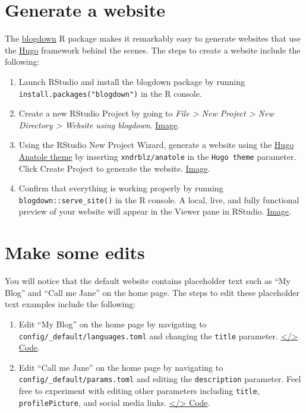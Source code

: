\documentclass[
]{book}
\begin{document}
\hypertarget{create-new-blogdown}{%
\section{Generate a website}\label{create-new-blogdown}}

The \href{https://bookdown.org/yihui/blogdown/}{blogdown} R package makes it remarkably easy to generate websites that use the \href{https://gohugo.io/}{Hugo} framework behind the scenes. The steps to create a website include the following:

\begin{enumerate}
\def\labelenumi{\arabic{enumi}.}
\item
  Launch RStudio and install the blogdown package by running \texttt{install.packages("blogdown")} in the R console.
\item
  Create a new RStudio Project by going to \emph{File \textgreater{} New Project \textgreater{} New Directory \textgreater{} Website using blogdown}. \href{https://i.imgur.com/eDg7V2k.png}{Image}.
\item
  Using the RStudio New Project Wizard, generate a website using the \href{https://themes.gohugo.io/anatole/}{Hugo Anatole theme} by inserting \texttt{xndrblz/anatole} in the \texttt{Hugo\ theme} parameter. Click Create Project to generate the website. \href{https://i.imgur.com/lkD1ZlU.png}{Image}.
\item
  Confirm that everything is working properly by running \texttt{blogdown::serve\_site()} in the R console. A local, live, and fully functional preview of your website will appear in the Viewer pane in RStudio. \href{https://i.imgur.com/oxZgeqM.png}{Image}.
\end{enumerate}

\hypertarget{make-some-edits}{%
\section{Make some edits}\label{make-some-edits}}

You will notice that the default website contains placeholder text such as ``My Blog'' and ``Call me Jane'' on the home page. The steps to edit these placeholder text examples include the following:

\begin{enumerate}
\def\labelenumi{\arabic{enumi}.}
\item
  Edit ``My Blog'' on the home page by navigating to \texttt{config/\_default/languages.toml} and changing the \texttt{title} parameter. \href{https://github.com/dannymorris/r4sites-demo/blob/master/config/_default/languages.toml\#L2}{\textless/\textgreater{} Code}.
\item
  Edit ``Call me Jane'' on the home page by navigating to \texttt{config/\_default/params.toml} and editing the \texttt{description} parameter. Feel free to experiment with editing other parameters including \texttt{title}, \texttt{profilePicture}, and social media links. \href{https://github.com/dannymorris/r4sites-demo/blob/master/config/_default/params.toml\#L2-L6}{\textless/\textgreater{} Code}.
\end{enumerate}
\end{document}
